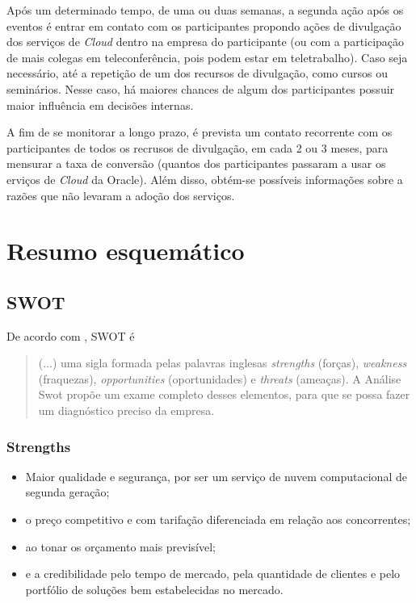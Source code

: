 \documentclass[a4paper]{article}
\begin{document}
Após um determinado tempo, de uma ou duas semanas, a segunda ação após os eventos é entrar em contato com os participantes propondo ações de divulgação dos serviços de \emph{Cloud} dentro na empresa do participante (ou com a participação de mais colegas em teleconferência, pois podem estar em teletrabalho). Caso seja necessário, até a repetição de um dos recursos de divulgação, como cursos ou seminários. Nesse caso, há maiores chances de algum dos participantes possuir maior influência em decisões internas.

A fim de se monitorar a longo prazo, é prevista um contato recorrente com os participantes de todos os recrusos de divulgação, em cada 2 ou 3 meses, para mensurar a taxa de conversão (quantos dos participantes passaram a usar os erviços de \emph{Cloud} da Oracle). Além disso, obtém-se possíveis informações sobre a razões que não levaram a adoção dos serviços.

\section{Resumo esquemático}

\subsection{SWOT}

De acordo com , SWOT é
\begin{quotation}
(...) uma sigla formada pelas palavras inglesas \emph{strengths} (forças), \emph{weakness} (fraquezas), \emph{opportunities} (oportunidades) e \emph{threats} (ameaças). A Análise Swot propõe um exame completo desses
elementos, para que se possa fazer um diagnóstico preciso da empresa.
\end{quotation}

\subsubsection{Strengths}
\begin{itemize}
\item Maior qualidade e segurança, por ser um serviço de nuvem computacional de segunda geração;
\item o preço competitivo e com tarifação diferenciada em relação aos concorrentes;
\item ao tonar os orçamento mais previsível;
\item e a credibilidade pelo tempo de mercado, pela quantidade de clientes e pelo portfólio de soluções bem estabelecidas no mercado.
\end{itemize}
\end{document}
